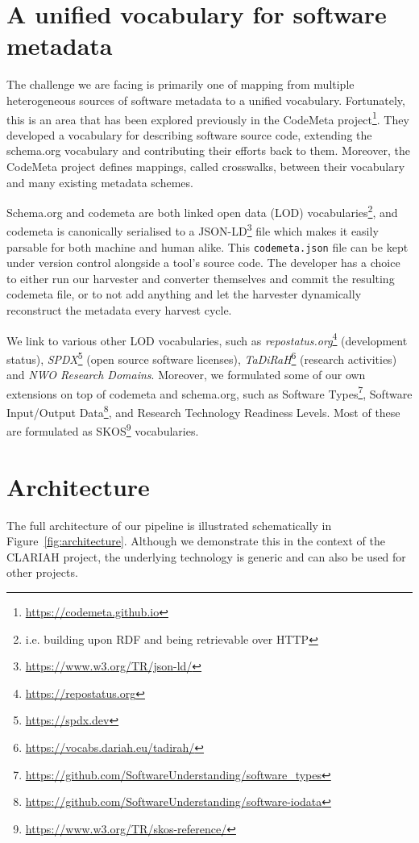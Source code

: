 \documentclass[a4paper,11pt]{article}
\begin{document}
\section{A unified vocabulary for software metadata}

The challenge we are facing is primarily one of mapping from multiple
heterogeneous sources of software metadata to a unified vocabulary.
Fortunately, this is an area that has been explored previously in the CodeMeta
project\footnote{\url{https://codemeta.github.io}}. They developed a
vocabulary for describing software source code, extending the
schema.org vocabulary and contributing their efforts back to them. Moreover,
the CodeMeta project defines mappings, called crosswalks, between their
vocabulary and many existing metadata schemes. 

Schema.org and codemeta are both linked open data (LOD)
vocabularies\footnote{i.e. building upon RDF and being retrievable over HTTP},
and codemeta is canonically serialised to a
JSON-LD\footnote{\url{https://www.w3.org/TR/json-ld/}} file which makes it
easily parsable for both machine and human alike. This \texttt{codemeta.json}
file can be kept under version control alongside a tool's source code. The
developer has a choice to either run our harvester and converter themselves and
commit the resulting codemeta file, or to not add anything and let the harvester
dynamically reconstruct the metadata every harvest cycle.

We link to various other LOD vocabularies, such as
\emph{repostatus.org}\footnote{\url{https://repostatus.org}} (development
status), \emph{SPDX}\footnote{\url{https://spdx.dev}} (open source software
licenses), \emph{TaDiRaH}\footnote{\url{https://vocabs.dariah.eu/tadirah/}}
(research activities) \citep{TADIRAH} and \emph{NWO Research Domains}.
Moreover, we formulated some of our own extensions on top of codemeta and
schema.org, such as Software
Types\footnote{\url{https://github.com/SoftwareUnderstanding/software_types}},
Software Input/Output
Data\footnote{\url{https://github.com/SoftwareUnderstanding/software-iodata}},
and Research Technology Readiness Levels. Most of these are formulated as SKOS\footnote{\url{https://www.w3.org/TR/skos-reference/}}
vocabularies.

\section{Architecture}

The full architecture of our pipeline is illustrated schematically in
Figure~\ref{fig:architecture}. Although we demonstrate this in the context of the
CLARIAH project, the underlying technology is generic and can also be used for
other projects.
\end{document}
